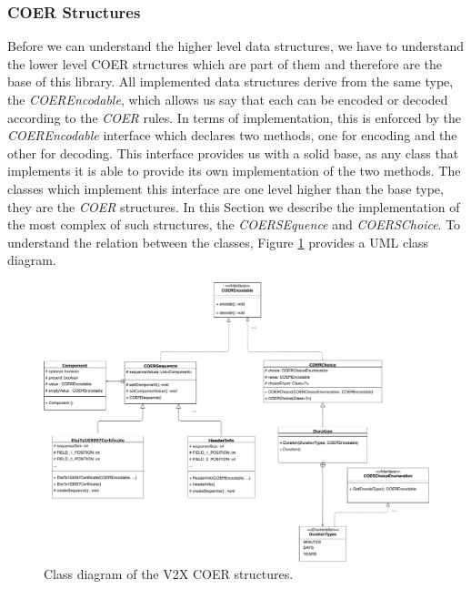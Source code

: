\subsubsection{COER Structures}
Before we can understand the higher level data structures, we have to understand the lower level COER structures which are part of them and therefore are the base of this library. All implemented data structures derive from the same type, the \textit{COEREncodable}, which allows us say that each can be encoded or decoded according to the \textit{COER} rules. In terms of implementation, this is enforced by the \textit{COEREncodable} interface which declares two methods, one for encoding and the other for decoding. This interface provides us with a solid base, as any class that implements it is able to provide its own implementation of the two methods. The classes which implement this interface are one level higher than the base type, they are the \textit{COER} structures. In this Section we describe the implementation of the most complex of such structures, the \textit{COERSEquence} and \textit{COERSChoice}. To understand the relation between the classes, Figure \ref{fig:coer_structures} provides a UML class diagram. 

\begin{figure}[t]
	\centering
	\includegraphics[width=1.1\textwidth]{Figures/coerstructures}
	\caption{\label{fig:coer_structures} Class diagram of the V2X {COER} structures.}
\end{figure}

